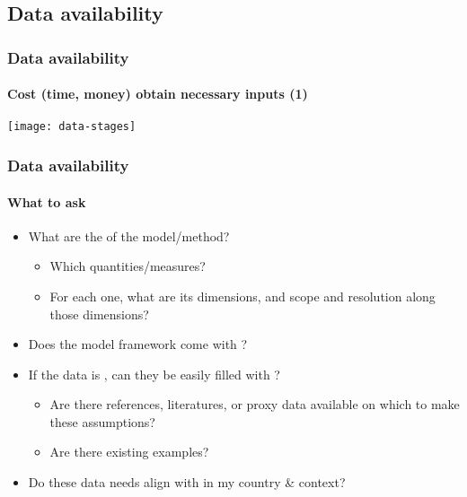 \documentclass[12pt,aspectratio=169]{beamer}
\begin{document}
\subsection{Data availability}
\begin{frame}
\frametitle{Data availability}
\framesubtitle{Cost (time, money) obtain necessary inputs (1)}
\texttt{[image: data-stages]}
\end{frame}

\begin{frame}
\frametitle{Data availability}
\framesubtitle{What to ask}
\begin{itemize}
  \item What are the  of the model/method?
    \begin{itemize}
      \item Which quantities/measures?
      \item For each one, what are its dimensions, and scope and resolution along those dimensions?
    \end{itemize}
  \item Does the model framework come with ?
  \item If the data is , can they be easily filled with ?
    \begin{itemize}
      \item Are there references, literatures, or proxy data available on which to make these assumptions?
      \item Are there existing examples?
    \end{itemize}
  \item Do these data needs align with  in my country \& context?
\end{itemize}

\end{frame}
\end{document}
